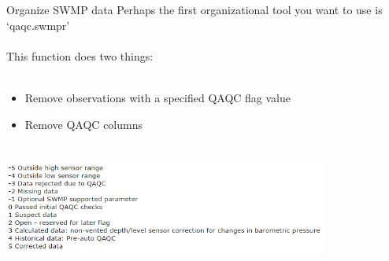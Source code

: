 \documentclass[xcolor=svgnames]{beamer}\usepackage[]{graphicx}\usepackage[]{color}
\begin{document}
\begin{frame}[containsverbatim]{Organize SWMP data}
Perhaps the first organizational tool you want to use is `qaqc.swmpr'\\~\\
This function does two things:\\~\\
\begin{itemize}
\item Remove observations with a specified QAQC flag value
\item Remove QAQC columns \\~\\
\end{itemize}
\centerline{\includegraphics[width = 0.8\textwidth]{qaqc_flags.png}}
\end{frame}
\end{document}
